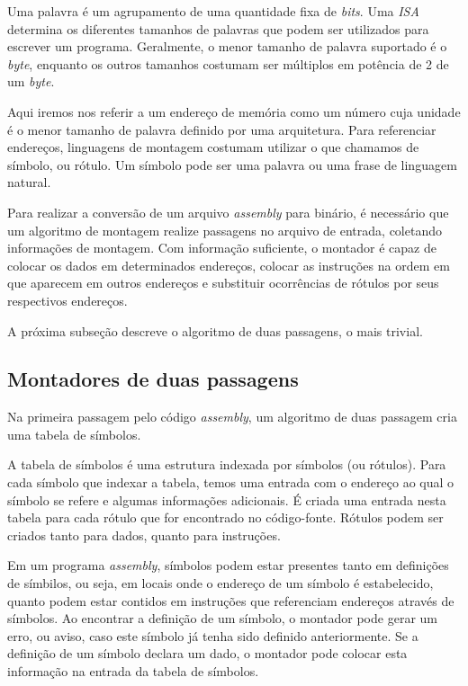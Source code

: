 Uma palavra é um agrupamento de uma quantidade fixa de \textit{bits}. Uma
\textit{ISA} determina os diferentes tamanhos de palavras que podem ser
utilizados para escrever um programa. Geralmente, o menor tamanho de palavra
suportado é o \textit{byte}, enquanto os outros tamanhos costumam ser múltiplos
em potência de 2 de um \textit{byte}.

Aqui iremos nos referir a um endereço de memória como um número cuja unidade é o
menor tamanho de palavra definido por uma arquitetura. Para referenciar
endereços, linguagens de montagem costumam utilizar o que chamamos de símbolo,
ou rótulo. Um símbolo pode ser uma palavra ou uma frase de linguagem natural.

Para realizar a conversão de um arquivo \textit{assembly} para binário, é
necessário que um algoritmo de montagem realize passagens no arquivo de entrada,
coletando informações de montagem. Com informação suficiente, o montador é capaz
de colocar os dados em determinados endereços, colocar as instruções na ordem em
que aparecem em outros endereços e substituir ocorrências de rótulos por seus
respectivos endereços.

A próxima subseção descreve o algoritmo de duas passagens, o mais trivial.

\subsection{Montadores de duas passagens}

Na primeira passagem pelo código \textit{assembly}, um algoritmo de duas
passagem cria uma tabela de símbolos.

A tabela de símbolos é uma estrutura indexada por símbolos (ou rótulos). Para
cada símbolo que indexar a tabela, temos uma entrada com o endereço ao qual o
símbolo se refere e algumas informações adicionais. É criada uma entrada nesta
tabela para cada rótulo que for encontrado no código-fonte. Rótulos podem ser
criados tanto para dados, quanto para instruções.

Em um programa \textit{assembly}, símbolos podem estar presentes tanto em
definições de símbilos, ou seja, em locais onde o endereço de um símbolo é
estabelecido, quanto podem estar contidos em instruções que referenciam
endereços através de símbolos. Ao encontrar a definição de um símbolo, o
montador pode gerar um erro, ou aviso, caso este símbolo já tenha sido definido
anteriormente. Se a definição de um símbolo declara um dado, o montador pode
colocar esta informação na entrada da tabela de símbolos.

